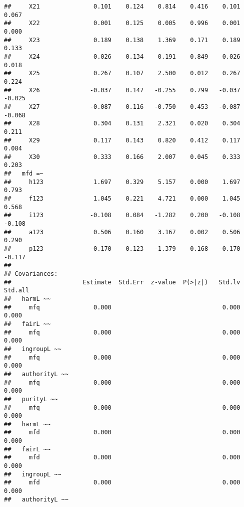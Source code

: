 \documentclass[english,man]{apa6}
\newcounter{author}
\theoremstyle{definition}
\theoremstyle{definition}
\theoremstyle{definition}
\theoremstyle{remark}
\begin{document}
\begin{verbatim}
##     X21               0.101    0.124    0.814    0.416    0.101    0.067
##     X22               0.001    0.125    0.005    0.996    0.001    0.000
##     X23               0.189    0.138    1.369    0.171    0.189    0.133
##     X24               0.026    0.134    0.191    0.849    0.026    0.018
##     X25               0.267    0.107    2.500    0.012    0.267    0.224
##     X26              -0.037    0.147   -0.255    0.799   -0.037   -0.025
##     X27              -0.087    0.116   -0.750    0.453   -0.087   -0.068
##     X28               0.304    0.131    2.321    0.020    0.304    0.211
##     X29               0.117    0.143    0.820    0.412    0.117    0.084
##     X30               0.333    0.166    2.007    0.045    0.333    0.203
##   mfd =~                                                                
##     h123              1.697    0.329    5.157    0.000    1.697    0.793
##     f123              1.045    0.221    4.721    0.000    1.045    0.568
##     i123             -0.108    0.084   -1.282    0.200   -0.108   -0.108
##     a123              0.506    0.160    3.167    0.002    0.506    0.290
##     p123             -0.170    0.123   -1.379    0.168   -0.170   -0.117
## 
## Covariances:
##                    Estimate  Std.Err  z-value  P(>|z|)   Std.lv  Std.all
##   harmL ~~                                                              
##     mfq               0.000                               0.000    0.000
##   fairL ~~                                                              
##     mfq               0.000                               0.000    0.000
##   ingroupL ~~                                                           
##     mfq               0.000                               0.000    0.000
##   authorityL ~~                                                         
##     mfq               0.000                               0.000    0.000
##   purityL ~~                                                            
##     mfq               0.000                               0.000    0.000
##   harmL ~~                                                              
##     mfd               0.000                               0.000    0.000
##   fairL ~~                                                              
##     mfd               0.000                               0.000    0.000
##   ingroupL ~~                                                           
##     mfd               0.000                               0.000    0.000
##   authorityL ~~                                                         

\end{verbatim}
\end{document}
